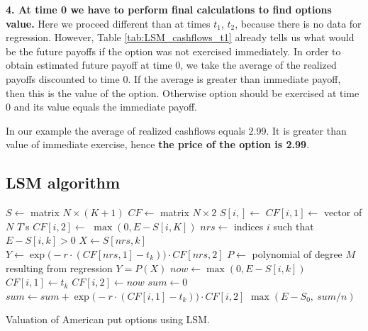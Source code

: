 \documentclass[a4paper,12pt, oneside]{book}
\theoremstyle{definition}
\theoremstyle{remark}
\begin{document}
\noindent \textbf{4. At time 0 we have to perform final calculations to find options value.} Here we proceed different than at times $t_1$, $t_2$, because there is no data for regression. However, Table \ref{tab:LSM_cashflows_t1} already tells us what would be the future payoffs if the option was not exercised immediately. In order to obtain estimated future payoff at time 0, we take the average of the realized payoffs discounted to time 0. If the average is greater than immediate payoff, then this is the value of the option. Otherwise option should be exercised at time 0 and its value equals the immediate payoff.

In our example the average of realized cashflows equals 2.99. It is greater than value of immediate exercise, hence \textbf{the price of the option is 2.99}.

\FloatBarrier
\subsection{LSM algorithm}
\begin{algorithm}
 \begin{algorithmic}[1]
    \State $S \gets$ matrix $N \times (K+1)$ 
    \State $CF \gets$ matrix $N \times 2$ 
     
      \State $S[i,] \gets$  
      \State $CF[i,1] \gets$ vector of $N$ $T$'s 
      \State $CF[i,2] \gets$ $\max(0, E - S[i,K])$ 
    \EndFor
      \State $nrs \gets $ indices $i$ such that $E - S[i,k] > 0$
      \State $X \gets S[nrs, k]$
      \State $Y \gets \exp\bigl(-r\cdot(CF[nrs, 1]-t_k) \bigr)\cdot CF[nrs, 2]$
      \State $P \gets $ polynomial of degree $M$ resulting from regression $Y = P(X)$
	\State $now \gets \max(0, E - S[i,k])$
	  \State $CF[i,1] \gets t_k$ 
	  \State $CF[i,2] \gets now$ 
	\EndIf
      \EndFor
    \EndFor
    \State $sum \gets 0$
      \State $sum \gets sum + \exp\bigl(-r\cdot(CF[i, 1]-t_k) \bigr)\cdot CF[i, 2]$
    \EndFor
    \State \Return $\max(E - S_0,\ sum/n)$
    \EndFunction 
 \end{algorithmic}
 \caption{Valuation of American put options using LSM.}
 \label{alg:LSM}
\end{algorithm}
\end{document}
